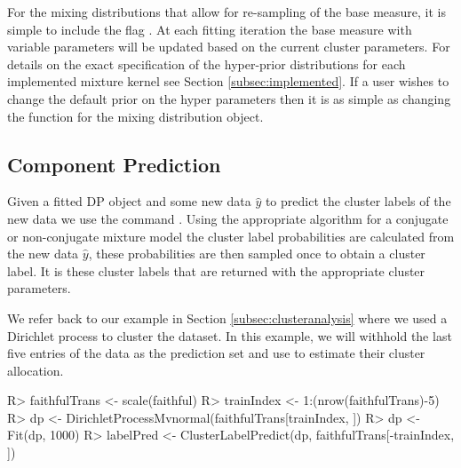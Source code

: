 \documentclass[nojss]{jss}
\begin{document}
For the mixing distributions that allow for re-sampling of the base measure, it is simple to include the flag . At each fitting iteration the base measure with variable parameters will be updated based on the current cluster parameters. For details on the exact specification of the hyper-prior distributions for each implemented mixture kernel see Section \ref{subsec:implemented}.  If a user wishes to change the default prior on the hyper parameters then it is as simple as changing the  function for the mixing distribution object.




\subsection{Component Prediction}
Given a fitted DP object and some new data $\hat{y}$ to predict the cluster labels of the new data we use the command . Using the appropriate algorithm for a conjugate or non-conjugate mixture model the cluster label probabilities are calculated from the new data $\hat{y}$, these probabilities are then sampled once to obtain a cluster label. It is these cluster labels that are returned with the appropriate cluster parameters.

We refer back to our example in Section \ref{subsec:clusteranalysis} where we used a Dirichlet process to cluster the  dataset. In this example, we will withhold the last five entries of the data as the prediction set and use  to estimate their cluster allocation.

\begin{Schunk}
\begin{Sinput}
R> faithfulTrans <- scale(faithful)
R> trainIndex <- 1:(nrow(faithfulTrans)-5)
R> dp <-  DirichletProcessMvnormal(faithfulTrans[trainIndex, ])
R> dp <- Fit(dp, 1000)
R> labelPred <- ClusterLabelPredict(dp, faithfulTrans[-trainIndex, ])
\end{Sinput}
\end{Schunk}
\end{document}
